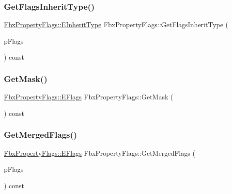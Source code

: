 \subsubsection{\texorpdfstring{Get\+Flags\+Inherit\+Type()}{GetFlagsInheritType()}}
{\footnotesize\ttfamily \hyperlink{class_fbx_property_flags_ae3b667a4fcac4b827fa186a698fec2f8}{Fbx\+Property\+Flags\+::\+E\+Inherit\+Type} Fbx\+Property\+Flags\+::\+Get\+Flags\+Inherit\+Type (\begin{DoxyParamCaption}\item[{\hyperlink{class_fbx_property_flags_afabfa7e0949aac8a7dcdf8a141867e99}{Fbx\+Property\+Flags\+::\+E\+Flags}}]{p\+Flags }\end{DoxyParamCaption}) const}

\mbox{\label{class_fbx_property_flags_a041432d0cdbc9a1fd7c1b9b720cbf816}} 
\subsubsection{\texorpdfstring{Get\+Mask()}{GetMask()}}
{\footnotesize\ttfamily \hyperlink{class_fbx_property_flags_afabfa7e0949aac8a7dcdf8a141867e99}{Fbx\+Property\+Flags\+::\+E\+Flags} Fbx\+Property\+Flags\+::\+Get\+Mask (\begin{DoxyParamCaption}{ }\end{DoxyParamCaption}) const}

\mbox{\label{class_fbx_property_flags_a20c4549ffb1167d35ba85a7d096b322c}} 
\subsubsection{\texorpdfstring{Get\+Merged\+Flags()}{GetMergedFlags()}}
{\footnotesize\ttfamily \hyperlink{class_fbx_property_flags_afabfa7e0949aac8a7dcdf8a141867e99}{Fbx\+Property\+Flags\+::\+E\+Flags} Fbx\+Property\+Flags\+::\+Get\+Merged\+Flags (\begin{DoxyParamCaption}\item[{\hyperlink{class_fbx_property_flags_afabfa7e0949aac8a7dcdf8a141867e99}{Fbx\+Property\+Flags\+::\+E\+Flags}}]{p\+Flags }\end{DoxyParamCaption}) const}

